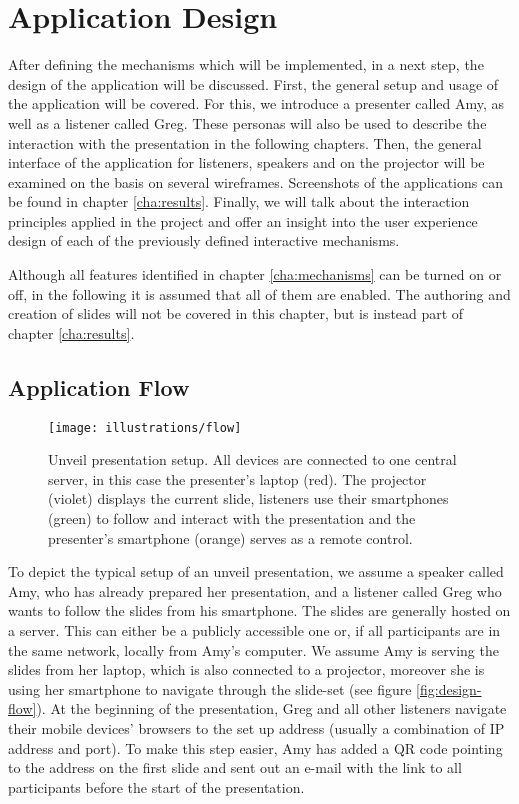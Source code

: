 \chapter{Application Design}
\label{cha:design}

After defining the mechanisms which will be implemented, in a next step, the design of the application will be discussed. First, the general setup and usage of the application will be covered. For this, we introduce a presenter called Amy, as well as a listener called Greg. These personas will also be used to describe the interaction with the presentation in the following chapters.
Then, the general interface of the application for listeners, speakers and on the projector will be examined on the basis on several wireframes. Screenshots of the applications can be found in chapter \ref{cha:results}. Finally, we will talk about the interaction principles applied in the project and offer an insight into the user experience design of each of the previously defined interactive mechanisms.

Although all features identified in chapter \ref{cha:mechanisms} can be turned on or off, in the following it is assumed that all of them are enabled. The authoring and creation of slides will not be covered in this chapter, but is instead part of chapter \ref{cha:results}.

\section{Application Flow}

\begin{figure}
\centering
\texttt{[image: illustrations/flow]}
\caption{Unveil presentation setup. All devices are connected to one central server, in this case the presenter's laptop (red). The projector (violet) displays the current slide, listeners use their smartphones (green) to follow and interact with the presentation and the presenter's smartphone (orange) serves as a remote control.}
\label{fig:design-design-flow}
\end{figure}

To depict the typical setup of an unveil presentation, we assume a speaker called Amy, who has already prepared her presentation, and a listener called Greg who wants to follow the slides from his smartphone.
The slides are generally hosted on a server. This can either be a publicly accessible one or, if all participants are in the same network, locally from Amy's computer. We assume Amy is serving the slides from her laptop, which is also connected to a projector, moreover she is using her smartphone to navigate through the slide-set (see figure \ref{fig:design-flow}).
At the beginning of the presentation, Greg and all other listeners navigate their mobile devices' browsers to the set up address (usually a combination of IP address and port). To make this step easier, Amy has added a QR code pointing to the address on the first slide and sent out an e-mail with the link to all participants before the start of the presentation.

